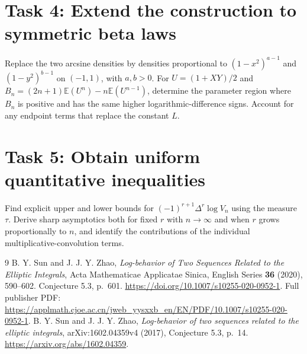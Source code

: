 \documentclass[11pt]{article}
\newcommand{\E}{\mathbb E}
\begin{document}
\section*{Task 4: Extend the construction to symmetric beta laws}
Replace the two arcsine densities by densities proportional to
$(1-x^2)^{a-1}$ and $(1-y^2)^{b-1}$ on $(-1,1)$, with $a,b>0$.
For $U=(1+XY)/2$ and
$B_n=(2n+1)\E(U^n)-n\E(U^{n-1})$, determine the parameter region
where $B_n$ is positive and has the same higher logarithmic-difference
signs. Account for any endpoint terms that replace the constant $L$.

\section*{Task 5: Obtain uniform quantitative inequalities}
Find explicit upper and lower bounds for
$(-1)^{r+1}\Delta^r\log V_n$ using the measure $\tau$.
Derive sharp asymptotics both for fixed $r$ with $n\to\infty$ and when
$r$ grows proportionally to $n$, and identify the contributions of
the individual multiplicative-convolution terms.

\clearpage
\begin{thebibliography}{9}
B. Y. Sun and J. J. Y. Zhao, \emph{Log-behavior of Two Sequences Related
to the Elliptic Integrals}, Acta Mathematicae Applicatae Sinica,
English Series \textbf{36} (2020), 590--602.
Conjecture 5.3, p.~601.
\url{https://doi.org/10.1007/s10255-020-0952-1}.
Full publisher PDF:
\url{https://applmath.cjoe.ac.cn/jweb_yysxxb_en/EN/PDF/10.1007/s10255-020-0952-1}.
B. Y. Sun and J. J. Y. Zhao, \emph{Log-behavior of two sequences related
to the elliptic integrals}, arXiv:1602.04359v4 (2017), Conjecture 5.3,
p.~14. \url{https://arxiv.org/abs/1602.04359}.
\end{thebibliography}
\end{document}
